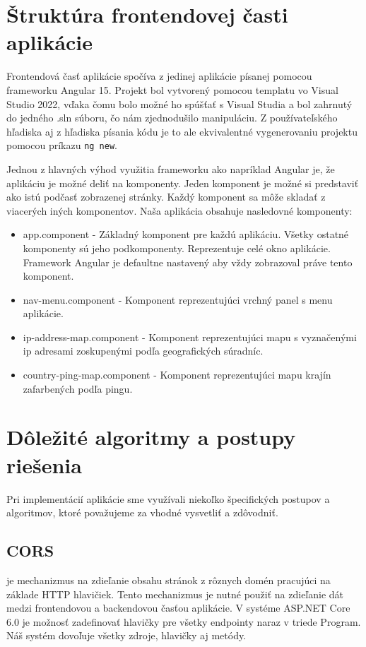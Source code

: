 \section{Štruktúra frontendovej časti aplikácie}
Frontendová časť aplikácie spočíva z jedinej aplikácie písanej pomocou frameworku Angular 15. Projekt bol vytvorený pomocou templatu vo Visual Studio 2022, vďaka čomu bolo možné ho 
spúšťať s Visual Studia a bol zahrnutý do jedného .sln súboru, čo nám zjednodušilo manipuláciu. Z používateľského hľadiska aj z hľadiska písania kódu je to ale ekvivalentné 
vygenerovaniu projektu pomocou príkazu \lstinline{ng new}.

Jednou z hlavných výhod využitia frameworku ako napríklad Angular je, že aplikáciu je možné deliť na komponenty. Jeden komponent je možné si predstaviť ako istú podčasť zobrazenej stránky. 
Každý komponent sa môže skladať z viacerých iných komponentov. Naša aplikácia obsahuje nasledovné komponenty:
\begin{itemize}
    \item app.component
    - Základný komponent pre každú aplikáciu. Všetky ostatné komponenty sú jeho podkomponenty. Reprezentuje celé okno aplikácie. Framework Angular je defaultne nastavený aby vždy 
    zobrazoval práve tento komponent. 
    \item nav-menu.component
    - Komponent reprezentujúci vrchný panel s menu aplikácie.
    \item ip-address-map.component
    - Komponent reprezentujúci mapu s vyznačenými ip adresami zoskupenými podľa geografických súradníc.
    \item country-ping-map.component 
    - Komponent reprezentujúci mapu krajín zafarbených podľa pingu.
\end{itemize}

\section{Dôležité algoritmy a postupy riešenia}
\label{postupy}

Pri implementácií aplikácie sme využívali niekoľko špecifických postupov a algoritmov, ktoré považujeme za vhodné vysvetliť a zdôvodniť. 

\subsection{CORS}
 je mechanizmus na zdieľanie obsahu stránok z rôznych domén pracujúci na základe HTTP hlavičiek. Tento mechanizmus je nutné použiť na zdieľanie dát medzi
frontendovou a backendovou časťou aplikácie. V systéme ASP.NET Core 6.0 je možnosť zadefinovať  hlavičky pre všetky endpointy naraz v triede Program. Náš systém dovoľuje všetky 
zdroje, hlavičky aj metódy.

